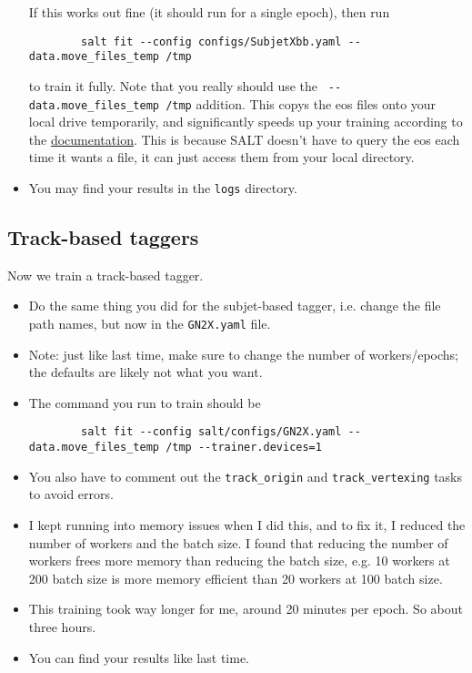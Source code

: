 \documentclass[11pt]{article}
\begin{document}
\begin{itemize}
\begin{verbatim}
    \end{verbatim}
    If this works out fine (it should run for a single epoch), then
    run
    \begin{verbatim}
        salt fit --config configs/SubjetXbb.yaml --data.move_files_temp /tmp
    \end{verbatim}
    to train it fully. Note that you really should use the
    \verb| --data.move_files_temp /tmp| addition. This
    copys the eos files onto your local drive temporarily,
    and significantly speeds up your training according to the
    \href{https://ftag-salt.docs.cern.ch/training/#slurm-batch}{documentation}.
    This is because SALT doesn't have to query the eos each time
    it wants a file, it can just access them from your local directory.
    \item You may find your results in the \verb|logs| directory.
\end{itemize}

\subsection{Track-based taggers}

Now we train a track-based tagger.

\begin{itemize}
    \item Do the same thing you did for the subjet-based tagger,
    i.e. change the file path names, but now in the \verb|GN2X.yaml|
    file.
    \item Note: just like last time, make sure to change the number of workers/epochs;
    the defaults are likely not what you want.
    \item The command you run to train should be
    \begin{verbatim}
        salt fit --config salt/configs/GN2X.yaml --data.move_files_temp /tmp --trainer.devices=1
    \end{verbatim}
    \item You also have to comment out the \verb|track_origin|
    and \verb|track_vertexing| tasks to avoid errors.
    \item I kept running into memory issues when I did this, and to
    fix it, I reduced the number of workers and the batch size. I found
    that reducing the number of workers frees more memory than reducing the
    batch size, e.g. 10 workers at 200 batch size is more memory efficient
    than 20 workers at 100 batch size.
    \item This training took way longer for me, around 20 minutes per epoch.
    So about three hours.
    \item You can find your results like last time. 
\end{itemize}
\end{document}
